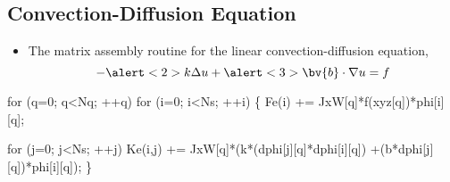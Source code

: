 \subsection*{Convection-Diffusion Equation}
\begin{frame}[fragile]  
  \begin{block}{}
    \begin{itemize}    
    \item{The matrix assembly routine for the linear convection-diffusion equation,
      \begin{equation}
	\nonumber
	-\alert<2>{k}\Delta u + \alert<3>{\bv{b} \cdot \nabla u} = f
      \end{equation}
    }
    \end{itemize}
  \end{block}
  \small
  \begin{semiverbatim}
for (q=0; q<Nq; ++q) 
  for (i=0; i<Ns; ++i) \{
    Fe(i)   += JxW[q]*f(xyz[q])*phi[i][q];
    
    for (j=0; j<Ns; ++j)
      Ke(i,j) += JxW[q]*(\alert<2>{k}*(dphi[j][q]*dphi[i][q]) 
                       +(\alert<3>{b*dphi[j][q]})*phi[i][q]);
  \}
  \end{semiverbatim}
\end{frame}
